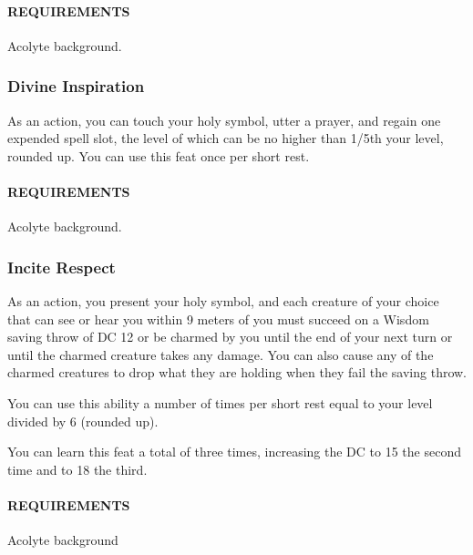         \paragraph{REQUIREMENTS} Acolyte background.

    \subsubsection{Divine Inspiration} \label{feat::divineinspiration}
        As an action, you can touch your holy symbol, utter a prayer, and regain one expended spell slot, the level of which can be no higher than 1/5th your level, rounded up.
        You can use this feat once per short rest.
        \paragraph{REQUIREMENTS} Acolyte background.

    \subsubsection{Incite Respect} \label{feat::inciterespect}
        As an action, you present your holy symbol, and each creature of your choice that can see or hear you within 9 meters of you must succeed on a Wisdom saving throw of DC 12 or be charmed by you until the end of your next turn or until the charmed creature takes any damage.
        You can also cause any of the charmed creatures to drop what they are holding when they fail the saving throw.

        You can use this ability a number of times per short rest equal to your level divided by 6 (rounded up).

        You can learn this feat a total of three times, increasing the DC to 15 the second time and to 18 the third.
        \paragraph{REQUIREMENTS} Acolyte background

